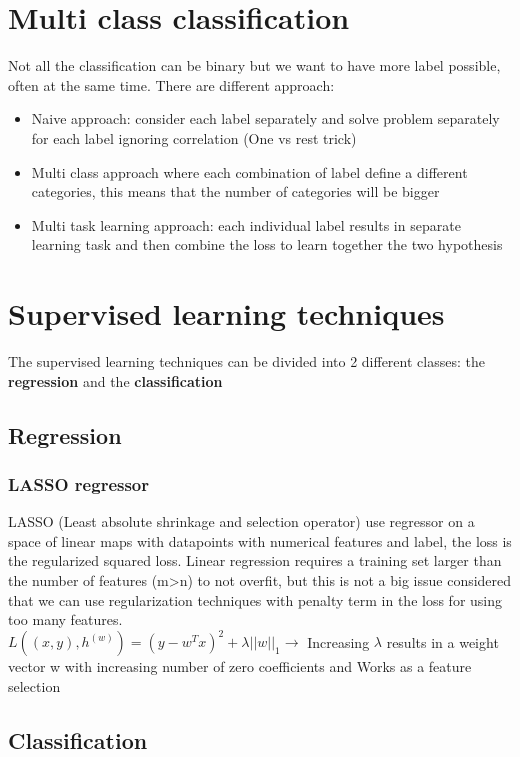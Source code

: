 \section{Multi class classification}

Not all the classification can be binary but we want to have more label possible, often at the same time. There are different approach:
\begin{itemize}
    \item Naive approach: consider each label separately and solve problem separately for each label ignoring correlation (One vs rest trick)
    \item Multi class approach where each combination of label define a different categories, this means that the number of categories will be bigger
    \item Multi task learning approach: each individual label results in separate learning task and then combine the loss to learn together the two hypothesis
\end{itemize}

\section{Supervised learning techniques}
The supervised learning techniques can be divided into 2 different classes: the \textbf{regression} and the \textbf{classification}

\subsection{Regression}
\subsubsection{LASSO regressor}
LASSO (Least absolute shrinkage and selection operator) use regressor on a space of linear maps with datapoints with numerical features and label, the loss is the regularized squared loss.
Linear regression requires a training set larger than the number of features (m>n) to not overfit, but this is not a big issue considered that we can use regularization techniques with  penalty term in the loss for using too many features.\\
$L((x,y),h^{(w)} ) = (y -w^Tx)^2 + \lambda ||w||_{1} \rightarrow $ Increasing $\lambda$ results in a weight vector w with increasing number of zero coefficients and Works as a feature selection


\subsection{Classification}
